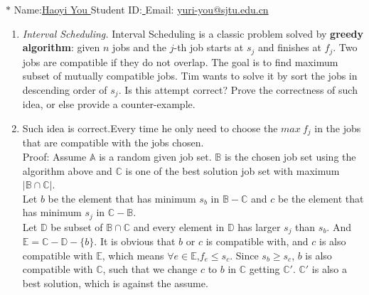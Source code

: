 \documentclass[12pt,a4paper]{article}
\makeatletter
\newtheorem*{solution}{Solution}
\theoremstyle{definition}
\renewenvironment{solution}[1][Solution] {\par\pushQED{\qed}\normalfont\topsep6\p@\@plus6\p@\relax\trivlist\item[\hskip\labelsep\bfseries#1\@addpunct{.}]\ignorespaces}{\popQED\endtrivlist\@endpefalse} \makeatother
\makeatother
\begin{document}
\noindent

\noindent{}


\begin{center}
\footnotesize{\color{blue}$*$ Name:\underline{\quad   Haoyi You  \quad  }\quad Student ID:\underline{ \quad} \quad Email: \underline{\quad yuri-you@sjtu.edu.cn \quad}}
\end{center}

\begin{enumerate}
	\item \textit{Interval Scheduling.} Interval Scheduling is a classic problem solved by \textbf{greedy algorithm}: given $n$ jobs and the $j$-th job starts at $s_j$ and finishes at $f_j$. Two jobs are compatible if they do not overlap. The goal is to find maximum subset of mutually compatible jobs. Tim wants to solve it by sort the jobs in descending order of $s_j$. Is this attempt correct? Prove the correctness of such idea, or else provide a counter-example.
	   \begin{solution}
	        Such idea is correct.Every time he only need to choose the  $max~f_j$ in the jobs that are compatible with the jobs chosen.\\
	        Proof:
	        Assume $\mathbb{A}$ is a random given job set. $\mathbb{B}$ is the chosen job set using the algorithm above and $\mathbb{C}$ is one of the best solution job set with maximum $|\mathbb{B\cap C}|$.\\
	        Let $b$ be the element that has minimum $s_b$  in $\mathbb{B-C}$ and $c$ be the element that has minimum $s_j$  in $\mathbb{C-B}$.\\
	        Let $\mathbb{D}$ be subset of $\mathbb{B\cap C}$ and every element in $\mathbb{D}$ has larger $s_j$ than $s_b$. And $\mathbb{E}= \mathbb{C-D}-\{ b\}$. It is obvious that $b$ or $c$ is compatible with, and $c$ is also compatible with $\mathbb{E}$, which means $\forall e\in \mathbb{E}$,$f_e\le s_c$. Since $s_b\ge s_c$, $b$ is also compatible with $\mathbb{C}$, such that we change $c$ to $b$ in $\mathbb{C}$ getting $\mathbb{C'}$. $\mathbb{C'}$ is also a best solution, which is against the assume.
	        
	        
	   \end{solution}
	

\end{enumerate}
\end{document}
